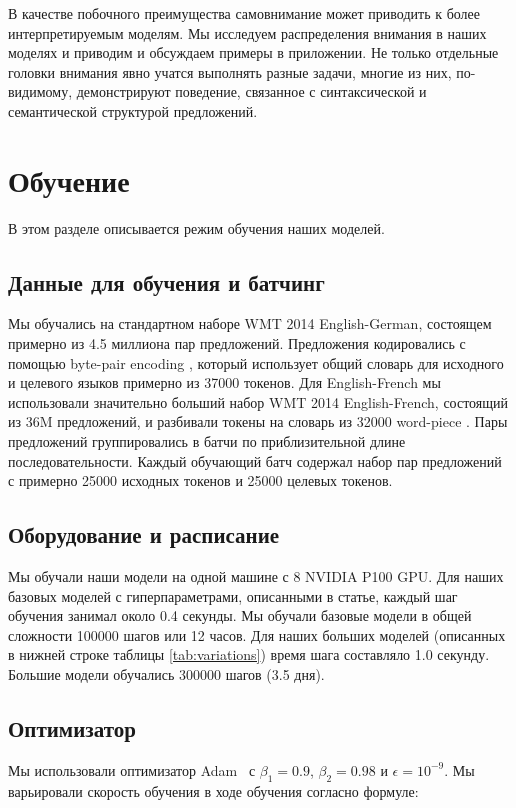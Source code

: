 \documentclass{article}
\begin{document}
В качестве побочного преимущества самовнимание может приводить к более интерпретируемым моделям. Мы исследуем распределения внимания в наших моделях и приводим и обсуждаем примеры в приложении. Не только отдельные головки внимания явно учатся выполнять разные задачи, многие из них, по-видимому, демонстрируют поведение, связанное с синтаксической и семантической структурой предложений.

\section{Обучение}
В этом разделе описывается режим обучения наших моделей. 


\subsection{Данные для обучения и батчинг}
Мы обучались на стандартном наборе WMT 2014 English-German, состоящем примерно из 4.5 миллиона пар предложений. Предложения кодировались с помощью byte-pair encoding \citep{DBLP:journals/corr/BritzGLL17}, который использует общий словарь для исходного и целевого языков примерно из 37000 токенов. Для English-French мы использовали значительно больший набор WMT 2014 English-French, состоящий из 36M предложений, и разбивали токены на словарь из 32000 word-piece \citep{wu2016google}. Пары предложений группировались в батчи по приблизительной длине последовательности. Каждый обучающий батч содержал набор пар предложений с примерно 25000 исходных токенов и 25000 целевых токенов.  

\subsection{Оборудование и расписание}

Мы обучали наши модели на одной машине с 8 NVIDIA P100 GPU. Для наших базовых моделей с гиперпараметрами, описанными в статье, каждый шаг обучения занимал около 0.4 секунды. Мы обучали базовые модели в общей сложности 100000 шагов или 12 часов. Для наших больших моделей (описанных в нижней строке таблицы \ref{tab:variations}) время шага составляло 1.0 секунду. Большие модели обучались 300000 шагов (3.5 дня).

\subsection{Оптимизатор} Мы использовали оптимизатор Adam~\citep{kingma2014adam} с $\beta_1=0.9$, $\beta_2=0.98$ и $\epsilon=10^{-9}$. Мы варьировали скорость обучения в ходе обучения согласно формуле:
\end{document}
